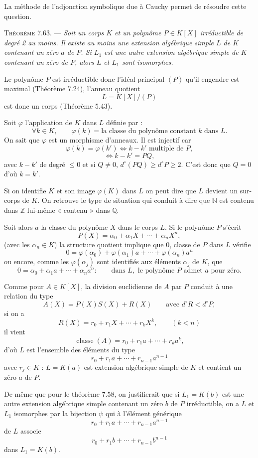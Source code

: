 La méthode de l'adjonction symbolique due à Cauchy permet de résoudre cette question.

\medskip\noindent\textsc{Théorème 7.63.} --- \emph{Soit un corps $K$ et un polynôme $P\in K[X]$ irréductible de degré 2 au moins. Il existe au moins une extension algébrique simple $L$ de $K$ contenant un zéro $a$ de $P$. Si $L_1$ est une autre extension algébrique simple de $K$ contenant un zéro de $P$, alors $L$ et $L_1$ sont isomorphes.}

Le polynôme $P$ est irréductible donc l'idéal principal $(P)$ qu'il engendre est maximal (Théorème 7.24), l'anneau quotient
\[
L=K[X]/(P)
\]
est donc un corps (Théorème 5.43).

Soit $\varphi$ l'application de $K$ dans $L$ définie par :
\[
\forall k\in K,\qquad \varphi(k)=\text{la classe du polynôme constant }k\text{ dans }L.
\]
On sait que $\varphi$ est un morphisme d'anneaux. Il est injectif car
\[
\varphi(k)=\varphi(k')\Longleftrightarrow k-k'\text{ multiple de }P,
\]
\[
\Longleftrightarrow k-k'=PQ,
\]
avec $k-k'$ de degré $\le0$ et si $Q\ne0$, $d^\circ(PQ)\ge d^\circ P\ge2$. C'est donc que $Q=0$ d'où $k=k'$.

Si on identifie $K$ et son image $\varphi(K)$ dans $L$ on peut dire que $L$ devient un sur-corps de $K$. On retrouve le type de situation qui conduit à dire que $\mathbb N$ est contenu dans $\mathbb Z$ lui-même « contenu » dans $\mathbb Q$.

Soit alors $a$ la classe du polynôme $X$ dans le corps $L$. Si le polynôme $P$ s'écrit
\[
P(X)=\alpha_0+\alpha_1X+\cdots+\alpha_nX^n,
\]
(avec les $\alpha_n\in K$) la structure quotient implique que 0, classe de $P$ dans $L$ vérifie
\[
0=\varphi(\alpha_0)+\varphi(\alpha_1)a+\cdots+\varphi(\alpha_n)a^n
\]
ou encore, comme les $\varphi(\alpha_j)$ sont identifiés aux éléments $\alpha_j$ de $K$, que
\[
0=\alpha_0+\alpha_1a+\cdots+\alpha_na^n :\qquad\text{dans }L,\text{ le polynôme }P\text{ admet }a\text{ pour zéro.}
\]

Comme pour $A\in K[X]$, la division euclidienne de $A$ par $P$ conduit à une relation du type
\[
A(X)=P(X)S(X)+R(X)\qquad\text{avec }d^\circ R<d^\circ P,
\]
si on a
\[
R(X)=r_0+r_1X+\cdots+r_kX^k,\qquad(k<n)
\]
il vient
\[
\operatorname{classe}(A)=r_0+r_1a+\cdots+r_ka^k,
\]
d'où $L$ est l'ensemble des éléments du type
\[
r_0+r_1a+\cdots+r_{n-1}a^{n-1}
\]
avec $r_j\in K$ : $L=K(a)$ est extension algébrique simple de $K$ et contient un zéro $a$ de $P$.

De même que pour le théorème 7.58, on justifierait que si $L_1=K(b)$ est une autre extension algébrique simple contenant un zéro $b$ de $P$ irréductible, on a $L$ et $L_1$ isomorphes par la bijection $\psi$ qui à l'élément générique
\[
r_0+r_1a+\cdots+r_{n-1}a^{n-1}
\]
de $L$ associe
\[
r_0+r_1b+\cdots+r_{n-1}b^{n-1}
\]
dans $L_1=K(b)$. \bookend

